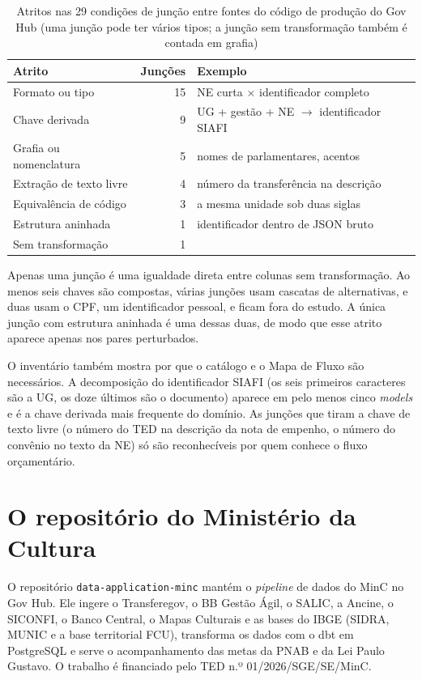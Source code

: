 \begin{table}[htbp]
\centering
\caption{Atritos nas 29 condições de junção entre fontes do código de produção
do Gov Hub (uma junção pode ter vários tipos; a junção sem transformação também
é contada em grafia)}
\label{tab:inventario}
\footnotesize
\begin{tabular}{@{}lrl@{}}
\toprule
\textbf{Atrito} & \textbf{Junções} & \textbf{Exemplo} \\
\midrule
Formato ou tipo & 15 & NE curta $\times$ identificador completo \\
Chave derivada & 9 & UG + gestão + NE $\rightarrow$ identificador SIAFI \\
Grafia ou nomenclatura & 5 & nomes de parlamentares, acentos \\
Extração de texto livre & 4 & número da transferência na descrição \\
Equivalência de código & 3 & a mesma unidade sob duas siglas \\
Estrutura aninhada & 1 & identificador dentro de JSON bruto \\
\midrule
Sem transformação & 1 & \\
\bottomrule
\end{tabular}
\end{table}

Apenas uma junção é uma igualdade direta entre colunas sem transformação. Ao
menos seis chaves são compostas, várias junções usam cascatas de
alternativas, e duas usam o CPF, um identificador pessoal, e ficam fora do
estudo. A única junção com estrutura aninhada é uma dessas duas, de modo que
esse atrito aparece apenas nos pares perturbados.

O inventário também mostra por que o catálogo e o Mapa de Fluxo são
necessários. A decomposição do identificador SIAFI (os seis primeiros
caracteres são a UG, os doze últimos são o documento) aparece em pelo menos
cinco \emph{models} e é a chave derivada mais frequente do domínio. As
junções que tiram a chave de texto livre (o número do TED na descrição da
nota de empenho, o número do convênio no texto da NE) só são reconhecíveis
por quem conhece o fluxo orçamentário.

\section{O repositório do Ministério da Cultura}
\label{sec:estudodecaso-minc}

O repositório \texttt{data-application-minc} mantém o \emph{pipeline} de
dados do MinC no Gov Hub. Ele ingere o Transferegov, o BB Gestão Ágil, o
SALIC, a Ancine, o SICONFI, o Banco Central, o Mapas Culturais e as bases do
IBGE (SIDRA, MUNIC e a base territorial FCU),
transforma os dados com o dbt em PostgreSQL e serve o acompanhamento das
metas da PNAB e da Lei Paulo Gustavo. O trabalho é financiado pelo TED n.º
01/2026/SGE/SE/MinC.

